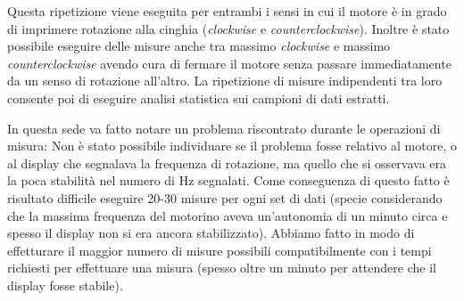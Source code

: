 \documentclass[a4paper,11pt]{article}
\begin{document}
Questa ripetizione viene eseguita per entrambi i sensi in cui il motore è in grado di imprimere rotazione alla cinghia (\textit{clockwise} e \textit{counterclockwise}). Inoltre è stato possibile eseguire delle misure anche tra massimo \textit{clockwise} e massimo \textit{counterclockwise} avendo cura di fermare il motore senza passare immediatamente da un senso di rotazione all'altro. La ripetizione di misure indipendenti tra loro consente poi di eseguire analisi statistica sui campioni di dati estratti.

In questa sede va fatto notare un problema riscontrato durante le operazioni di misura: Non è stato possibile individuare se il problema fosse relativo al motore, o al display che segnalava la frequenza di rotazione, ma quello che si osservava era la poca stabilità nel numero di Hz segnalati. Come conseguenza di questo fatto è risultato difficile eseguire 20-30 misure per ogni set di dati (specie considerando che la massima frequenza del motorino aveva un'autonomia di un minuto circa e spesso il display non si era ancora stabilizzato). Abbiamo fatto in modo di effetturare il maggior numero di misure possibili compatibilmente con i tempi richiesti per effettuare una misura (spesso oltre un minuto per attendere che il display fosse stabile).
\end{document}
